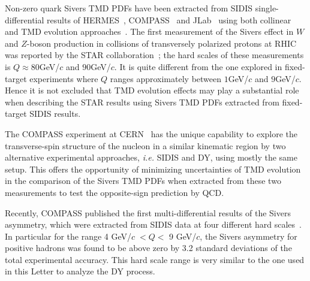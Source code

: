 \documentclass[a4paper,manyauthors,nocleardouble,COMPASS]{cernphprep}
\newcommand{\gvc}{GeV/$c$}
\begin{document}
Non-zero quark Sivers TMD PDFs have been extracted from SIDIS single-differential results of HERMES~\cite{Airapetian:2009ae}, COMPASS~\cite{Ageev:2006da,Alekseev:2008aa, Adolph:2012sp,Adolph:2014zba} and JLab~\cite{Qian:2011py} using both collinear~\cite{Anselmino:2005ea, Anselmino:2008sga} and TMD evolution approaches~\cite{Aybat:2011ta, Anselmino:2012aa, Anselmino:2016uie,Echevarria:2014xaa,Sun:2013hua}.
%
The first measurement of the Sivers effect in $W$ and $Z$-boson production in collisions of transversely polarized protons at RHIC was reported by the STAR collaboration~\cite{Adamczyk:2015gyk};
the hard scales of these measurements is $Q\approx 80$\;\gvc\; and $90$\;\gvc. It is quite different from the one explored in fixed-target experiments where $Q$ ranges approximately between $1$\;\gvc\; and $9$\;\gvc. Hence it is not excluded that TMD evolution effects may play a substantial role when describing the STAR results using Sivers TMD PDFs extracted from fixed-target SIDIS results.

The COMPASS experiment at CERN~\cite{Abbon:2007pq, Gautheron:2010wva} has the unique capability to explore the transverse-spin structure of the nucleon in a similar kinematic region by two alternative experimental approaches, \textit{i.e.} SIDIS and DY, using mostly the same setup.
This offers the opportunity of minimizing uncertainties of TMD evolution in the comparison of the Sivers TMD PDFs when extracted from these two measurements to test the opposite-sign prediction by QCD.

Recently, COMPASS published the first multi-differential results of the Sivers asymmetry, which were extracted from SIDIS data at four different hard scales~\cite{Adolph:2016dvl}. In particular for the range 4 \gvc$\;<Q<$ 9 \gvc, the Sivers asymmetry for positive hadrons was found to be above zero by 3.2 standard deviations of the total experimental accuracy. This hard scale range is very similar to the one used in this Letter to analyze the DY process.
%
%
\end{document}
